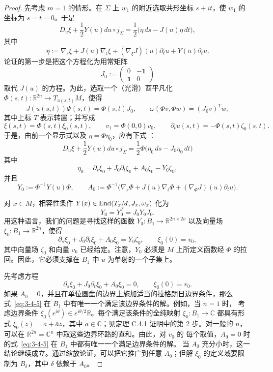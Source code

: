 \begin{proof}
先考虑 $m=1$ 的情形。在 $\Sigma$ 上 $w_1$ 的附近选取共形坐标 $s+it$，使 $w_1$ 的
坐标为 $s=t=0$。于是
\[
  D_u\xi+\frac12Y(u)du\circ j_\Sigma
  =\frac12\bigl(\eta\,ds-J(u)\eta\,dt\bigr),
\]
其中
\[
  \eta:=\nabla_s\xi+J(u)\nabla_t\xi
  +(\nabla_\xi J)(u)\partial_tu+Y(u)\partial_tu.
\]
论证的第一步是把这个方程化为用常矩阵
\[
  J_0:=
  \begin{pmatrix}
    0&-\mathbf1\\
    \mathbf1&0
  \end{pmatrix}
\]
取代 $J(u)$ 的方程。为此，选取一个（光滑）酉平凡化
$\Phi(s,t):\mathbb R^{2n}\to T_{u(s,t)}M$，使得
\[
  J(u(s,t))\Phi(s,t)=\Phi(s,t)J_0,
  \qquad
  \omega(\Phi v,\Phi w)=(J_0v)^Tw,
\]
其中上标 $T$ 表示转置；并写成
\[
  \xi(s,t)=\Phi(s,t)\xi_0(s,t),\qquad
  v_1=\Phi(0,0)v_0,\qquad
  \partial_tu(s,t)=-\Phi(s,t)\zeta_0(s,t).
\]
于是，由前一个显示式以及 $\eta=\Phi\eta_0$，应有下式
：
\[
  D_u\xi+\frac12Y(u)du\circ j_\Sigma
  =\frac12\Phi\bigl(\eta_0\,ds-J_0\eta_0\,dt\bigr)
\]
其中
\[
  \eta_0=\partial_s\xi_0+J_0\partial_t\xi_0+A_0\xi_0-Y_0\zeta_0,
\]
并且
\[
  Y_0:=\Phi^{-1}Y(u)\Phi,\qquad
  A_0:=\Phi^{-1}
  \bigl(\nabla_s\Phi+J(u)\nabla_t\Phi+(\nabla_\Phi J)(u)\partial_tu\bigr).
\]

对 $x\in M$，相容性条件
$Y(x)\in\operatorname{End}(T_xM,J_x,\omega_x)$ 化为
\[
  Y_0=Y_0^T=J_0Y_0J_0.
\]
用这种语言，我们的问题是寻找这样的函数
$Y_0:B_1\to\mathbb R^{2n\times2n}$ 以及向量场
$\xi_0:B_1\to\mathbb R^{2n}$，使得
\[
  \partial_s\xi_0+J_0\partial_t\xi_0+A_0\xi_0=Y_0\zeta_0,
  \qquad
  \xi_0(0)=v_0,
\]
其中向量场 $\zeta_0$ 和向量 $v_0$ 已经给定。注意，$Y_0$ 必须是 $M$ 上所定义函数经
$\Phi$ 的拉回。因此，它必须支撑在 $B_1$ 中 $u$ 为单射的一个子集上。

先考虑方程
\begin{equation}\label{eq:3-4-5}
  \partial_s\xi_0+J_0\partial_t\xi_0+A_0\xi_0=0,
  \qquad
  \xi_0(0)=v_0.
\end{equation}
如果 $A_0=0$，并且在单位圆盘的边界上施加适当的拉格朗日边界条件，那么
式~\eqref{eq:3-4-5} 在 $B_1$ 中有唯一一个满足该边界条件的解。例如，当 $n=1$ 时，
考虑边界条件
$\xi_0(e^{i\theta})\in e^{i\theta/2}\mathbb R$。每个满足该条件的全纯映射
$\xi_0:B_1\to\mathbb C$ 都具有形式
$\xi_0(z)=a+\bar a z$，其中 $a\in\mathbb C$；见定理 C.4.1 证明中的第 2 步。对一般的
$n$，可以在 $\mathbb R^{2n}=\mathbb C^n$ 中取这些边界环路的直和。由此，对 $v_0$ 的
每个取值，$A_0=0$ 时的式~\eqref{eq:3-4-5} 在 $B_1$ 中都有唯一一个满足边界条件的解。
当 $A_0$ 充分小时，这一结论继续成立。通过缩放论证，可以把它推广到任意 $A_0$；但解
$\xi_0$ 的定义域要限制为 $B_\delta$，其中 $\delta$ 依赖于 $A_0$。


\end{proof}
